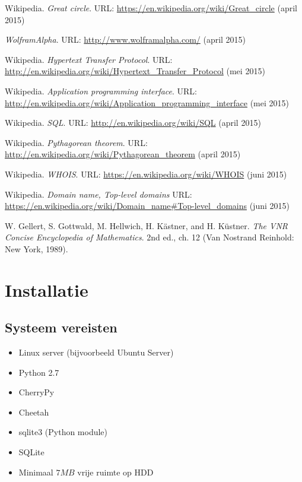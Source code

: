 \documentclass[twoside,openright]{uva-bachelor-thesis}
\begin{document}
\begin{thebibliography}{9}
	Wikipedia.
	\textit{Great circle}.
	URL: \url{https://en.wikipedia.org/wiki/Great_circle}
	(april 2015)
	
	\textit{WolframAlpha}.
	URL: \url{http://www.wolframalpha.com/}
	(april 2015)
	
	Wikipedia.
	\textit{Hypertext Transfer Protocol}.
	URL: \url{http://en.wikipedia.org/wiki/Hypertext_Transfer_Protocol}
	(mei 2015)
	
	Wikipedia.
	\textit{Application programming interface}.
	URL: \url{http://en.wikipedia.org/wiki/Application_programming_interface}
	(mei 2015)
	
	Wikipedia.
	\textit{SQL}.
	URL: \url{http://en.wikipedia.org/wiki/SQL}
	(april 2015)
	
	Wikipedia.
	\textit{Pythagorean theorem}.
	URL: \url{http://en.wikipedia.org/wiki/Pythagorean_theorem}
	(april 2015)
	
	Wikipedia.
	\textit{WHOIS}.
	URL: \url{https://en.wikipedia.org/wiki/WHOIS}
	(juni 2015)
	
	Wikipedia.
	\textit{Domain name, Top-level domains}
	URL: \url{https://en.wikipedia.org/wiki/Domain_name#Top-level_domains}
	(juni 2015)
	
	W. Gellert, S. Gottwald, M. Hellwich, H. Kästner, and H. Küstner. 
	\textit{The VNR Concise Encyclopedia of Mathematics}.
	 2nd ed., ch. 12 (Van Nostrand Reinhold: New York, 1989).
\end{thebibliography}
\newpage
\appendix
\chapter{Installatie}
	\label{app:install}
	\section{Systeem vereisten}
		\begin{itemize}
			\item Linux server (bijvoorbeeld Ubuntu Server)
			\item Python 2.7
			\item CherryPy
			\item Cheetah
			\item sqlite3 (Python module)
			\item SQLite
			\item Minimaal $7MB$ vrije ruimte op HDD
		\end{itemize}
\end{document}
